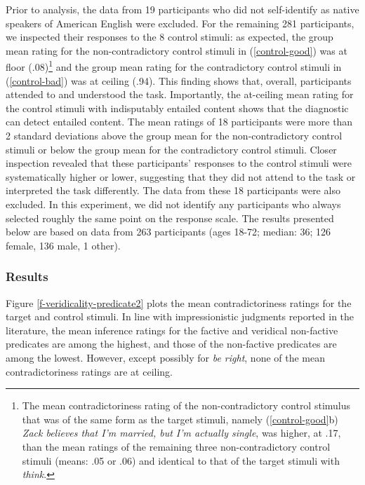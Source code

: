 \documentclass[11pt,fleqn]{article}
\newcommand{\6}{\mbox{$[\hspace*{-.6mm}[$}}
\newcommand{\9}{\mbox{$]\hspace*{-.6mm}]$}}
\begin{document}
{Prior to analysis, the data from 19 participants who did not self-identify as native speakers of American English were excluded. For the remaining 281 participants, we inspected their responses to the 8 control stimuli: as expected, the group mean rating for the non-contradictory control stimuli in (\ref{control-good}) was at floor (.08)\footnote{The mean contradictoriness rating of the non-contradictory control stimulus that was of the same form as the target stimuli, namely (\ref{control-good}b) {\em Zack believes that I'm married, but I'm actually single}, was higher, at .17, than the mean ratings of the remaining three non-contradictory control stimuli (means: .05 or .06) and identical to that of the target stimuli with {\em think}.}  and the group mean rating for the contradictory control stimuli in (\ref{control-bad}) was at ceiling (.94). This finding shows that, overall, participants attended to and understood the task. Importantly, the at-ceiling mean rating for the control stimuli with indisputably entailed content shows that the diagnostic can detect entailed content. The mean ratings of 18 participants were more than 2 standard deviations above the group mean for the non-contradictory control stimuli or below the group mean for the contradictory control stimuli. Closer inspection revealed that these participants' responses to the control stimuli were systematically higher or lower, suggesting that they did not attend to the task or interpreted the task differently. The data from these 18 participants were also excluded. In this experiment, we did not identify any participants who always selected roughly the same point on the response scale. The results presented below are based on data from 263 participants (ages 18-72; median: 36; 126 female, 136 male, 1 other).

\subsubsection{Results}


Figure \ref{f-veridicality-predicate2} plots the mean contradictoriness ratings for the target and control stimuli. In line with impressionistic judgments reported in the literature, the mean inference ratings for the factive and veridical non-factive predicates are among the highest, and those of the non-factive predicates are among the lowest. However, except possibly for {\em be right}, none of the mean contradictoriness ratings are at ceiling.

}
\end{document}
